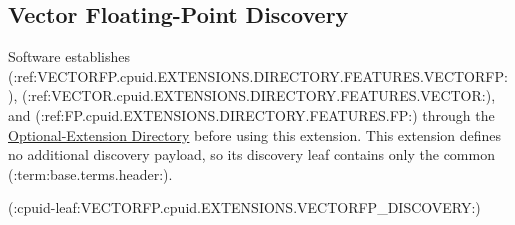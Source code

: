 \subsection{Vector Floating-Point Discovery}

Software establishes (:ref:VECTORFP.cpuid.EXTENSIONS.DIRECTORY.FEATURES.VECTORFP:), (:ref:VECTOR.cpuid.EXTENSIONS.DIRECTORY.FEATURES.VECTOR:), and (:ref:FP.cpuid.EXTENSIONS.DIRECTORY.FEATURES.FP:) through the
\hyperref[section:cpuid-extension-directory]{Optional-Extension Directory} before using this extension. This
extension defines no additional discovery payload, so its discovery leaf contains only the common
(:term:base.terms.header:).

(:cpuid-leaf:VECTORFP.cpuid.EXTENSIONS.VECTORFP_DISCOVERY:)
